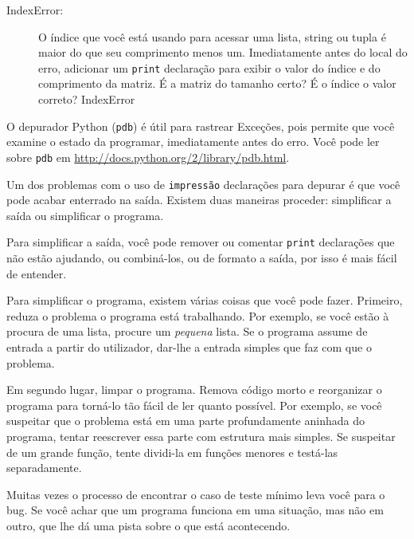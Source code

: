 \documentclass[10pt]{book}
\begin{document}
\begin{exercise}
\begin{v erbatim}
\begin{description}
\item[IndexError:] O índice que você está usando
para acessar uma lista, string ou tupla é maior do que
seu comprimento menos um. Imediatamente antes do local do erro,
adicionar um {\tt print} declaração para exibir
o valor do índice e do comprimento da matriz.
É a matriz do tamanho certo? É o índice o valor correto?
\index{} IndexError

\end{description}

O depurador Python ({\tt pdb}) é útil para rastrear
Exceções, pois permite que você examine o estado da
programar, imediatamente antes do erro. Você pode ler
sobre {\tt pdb} em \url{http://docs.python.org/2/library/pdb.html}.



Um dos problemas com o uso de {\tt impressão} declarações para depurar
é que você pode acabar enterrado na saída. Existem duas maneiras
proceder: simplificar a saída ou simplificar o programa.

Para simplificar a saída, você pode remover ou comentar {\tt print}
declarações que não estão ajudando, ou combiná-los, ou de formato
a saída, por isso é mais fácil de entender.

Para simplificar o programa, existem várias coisas que você pode fazer. Primeiro,
reduza o problema o programa está trabalhando. Por exemplo, se você
estão à procura de uma lista, procure um {\em pequena} lista. Se o programa assume
de entrada a partir do utilizador, dar-lhe a entrada simples que faz com que o
problema.

Em segundo lugar, limpar o programa. Remova código morto e reorganizar o
programa para torná-lo tão fácil de ler quanto possível. Por exemplo, se você
suspeitar que o problema está em uma parte profundamente aninhada do programa,
tentar reescrever essa parte com estrutura mais simples. Se suspeitar de um
grande função, tente dividi-la em funções menores e testá-las
separadamente.

Muitas vezes o processo de encontrar o caso de teste mínimo leva você para o
bug. Se você achar que um programa funciona em uma situação, mas não em
outro, que lhe dá uma pista sobre o que está acontecendo.


\end{v erbatim}
\end{exercise}
\end{document}
